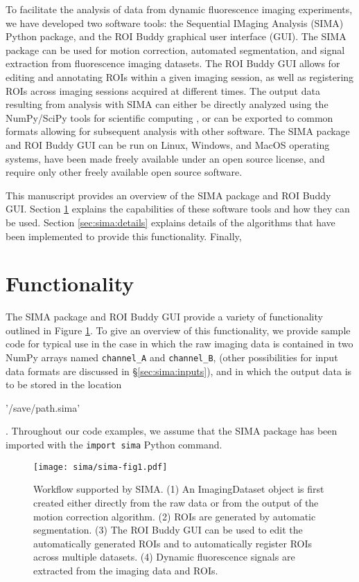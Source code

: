 To facilitate the analysis of data from dynamic fluorescence imaging experiments,
we have developed two software tools:
the Sequential IMaging Analysis (SIMA) Python package,
and the ROI Buddy graphical user interface (GUI). 
The SIMA package can be used for motion correction, automated segmentation,
and signal extraction from fluorescence imaging datasets.
The ROI Buddy GUI allows for editing and annotating ROIs
within a given imaging session, as well as registering ROIs across imaging sessions acquired at different times.
The output data resulting from analysis with SIMA can either be directly
analyzed using the NumPy/SciPy tools for scientific computing 
\citep{Oliphant2007, Jones2001}, or can be exported to common formats
allowing for subsequent analysis with other software.
The SIMA package and ROI Buddy GUI can be run on Linux, Windows, and MacOS
operating systems, have been made freely available under an open source
license, and require only other freely available open source software.

This manuscript provides an overview of the SIMA package and ROI Buddy GUI.
Section \ref{sec:sima:functionality} explains the capabilities of these software
tools and how they can be used.
Section \ref{sec:sima:details} explains details of the algorithms that have
been implemented to provide this functionality.
Finally, 


\section{Functionality}
\label{sec:sima:functionality}
The SIMA package and ROI Buddy GUI provide a variety of functionality outlined in Figure \ref{fig:sima:workflow}.
To give an overview of this functionality, we provide sample code for typical use
in the case in which the raw imaging data is contained in two NumPy arrays
named \verb|channel_A| and \verb|channel_B|,
(other possibilities for input data formats are discussed in \S\ref{sec:sima:inputs}),
and in which the output data is to be stored in the location 
\begin{verb}'/save/path.sima'\end{verb}.
Throughout our code examples, we assume that the SIMA package has been imported
with the \verb|import sima| Python command.

\begin{figure}[ht]
\centering
\texttt{[image: sima/sima-fig1.pdf]}
\caption[Workflow supported by SIMA]{
 Workflow supported by SIMA. 
 (1) An ImagingDataset object is first created either directly from the raw data
 or from the output of the motion correction algorithm.
 (2) ROIs are generated by automatic segmentation.
 (3) The ROI Buddy GUI can be used to edit the automatically generated ROIs and to
 automatically register ROIs across multiple datasets.
 (4) Dynamic fluorescence signals are extracted from the imaging data and ROIs.}
 \label{fig:sima:workflow}
\end{figure}


